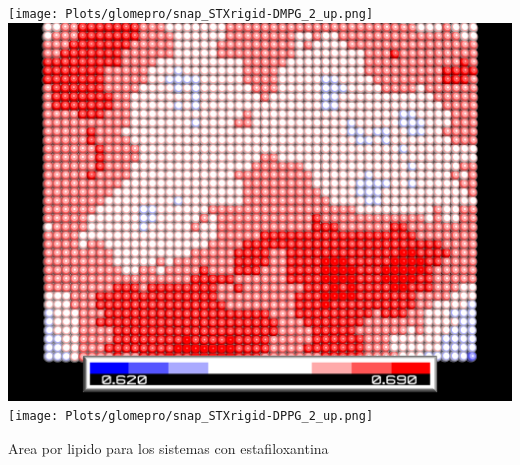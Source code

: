 \begin{center}
\texttt{[image: Plots/glomepro/snap\_STXrigid-DMPG\_2\_up.png]}
\includegraphics[resolution=100,scale=0.01]{Plots/glomepro/snap_STXrigid-DPPG_2_do.png}
\texttt{[image: Plots/glomepro/snap\_STXrigid-DPPG\_2\_up.png]}
\caption{Area por lipido para los sistemas con estafiloxantina}
\end{center} 
